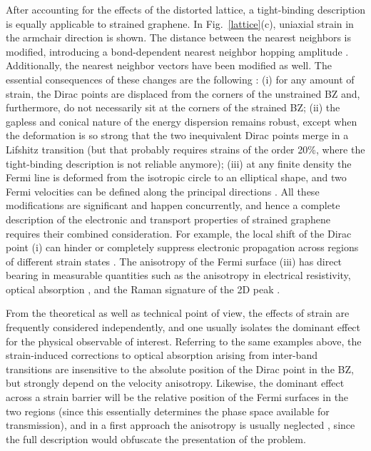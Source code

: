 After accounting for the effects of the distorted lattice, a tight-binding description is equally applicable to strained graphene.
In Fig.~\ref{lattice}(c), uniaxial strain in the armchair direction is shown.
The distance between the nearest neighbors is modified, introducing a bond-dependent nearest neighbor hopping amplitude \cite{Hasegawa2006}.
Additionally, the nearest neighbor vectors have been modified as well.
The essential consequences of these changes are the following \cite{Pereira2009}:
(i) for any amount of strain, the Dirac points are displaced from the corners of the unstrained BZ and, furthermore, do not necessarily sit at the corners of the strained BZ;
(ii) the gapless and conical nature of the energy dispersion remains robust, except when the deformation is so strong that the two inequivalent Dirac points merge in a Lifshitz transition (but that probably requires strains of the order 20\%, where the tight-binding description is not reliable anymore);
(iii) at any finite density the Fermi line is deformed from the isotropic circle to an elliptical shape, and two Fermi velocities can be defined along the principal directions \cite{Pereira2009,Pereira2010c,Choi2010}.
All these modifications are significant and happen concurrently, and hence a complete description of the electronic and transport properties of strained graphene requires their combined consideration.
For example, the local shift of the Dirac point (i) can hinder or completely suppress electronic propagation across regions of different strain states \cite{Pereira2009a,Fogler2008}.
The anisotropy of the Fermi surface (iii) has direct bearing in measurable quantities such as the anisotropy in electrical resistivity\cite{Kim2009}, optical absorption \cite{Pereira2010c,Pellegrino2010}, and the Raman signature of the 2D peak \cite{Huang2010, Mohr2010a, Frank2011, Yoon2011}.

From the theoretical as well as technical point of view, the effects of strain are frequently considered independently, and one usually isolates the dominant effect for the physical observable of interest.
Referring to the same examples above, the strain-induced corrections to optical absorption arising from inter-band transitions are insensitive to the absolute position of the Dirac point in the BZ, but strongly depend on the velocity anisotropy\cite{Pereira2010c,Pellegrino2010}.
Likewise, the dominant effect across a strain barrier will be the relative position of the Fermi surfaces in the two regions (since this essentially determines the phase space available for transmission), and in a first approach the anisotropy is usually neglected \cite{Fogler2008,Pereira2009a}, since the full description would obfuscate the presentation of the problem.

